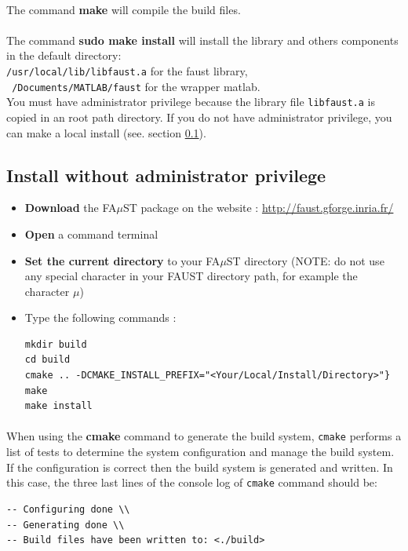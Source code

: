 \paragraph{}The command \textbf{make} will compile the build files.

\paragraph{}The command \textbf{sudo make install} will install the library and others components in the default directory: \\
\texttt{/usr/local/lib/libfaust.a} for the faust library, \\
\texttt{~/Documents/MATLAB/faust} for the wrapper matlab.\\

You must have administrator privilege because the library file \texttt{libfaust.a} is copied in an root path directory. If you do not have administrator privilege, you can make a local install (see. section \ref{sec:UnixBuildInstallNOAdmin}).

\subsection{Install without administrator privilege}\label{sec:UnixBuildInstallNOAdmin}

\begin{itemize}
\item \textbf{Download} the FA$\mu$ST package on the website :  \url{http://faust.gforge.inria.fr/}
\item \textbf{Open} a command terminal
\item \textbf{Set the current directory} to your FA$\mu$ST directory (NOTE: do not use any special character in your FAUST directory path, for example the character $\mu$)
\item Type the following commands : 
\begin{lstlisting}
mkdir build
cd build
cmake .. -DCMAKE_INSTALL_PREFIX="<Your/Local/Install/Directory>"}
make
make install
\end{lstlisting}
\end{itemize}

\paragraph{}When using the \textbf{cmake} command to generate the build system, \texttt{cmake} performs a list of tests to determine the system configuration and manage the build system. If the configuration is correct then the build system is generated and written. In this case, the three last lines of the console log of \texttt{cmake} command should be: \\
\begin{lstlisting}
-- Configuring done \\
-- Generating done \\
-- Build files have been written to: <./build>
\end{lstlisting}

